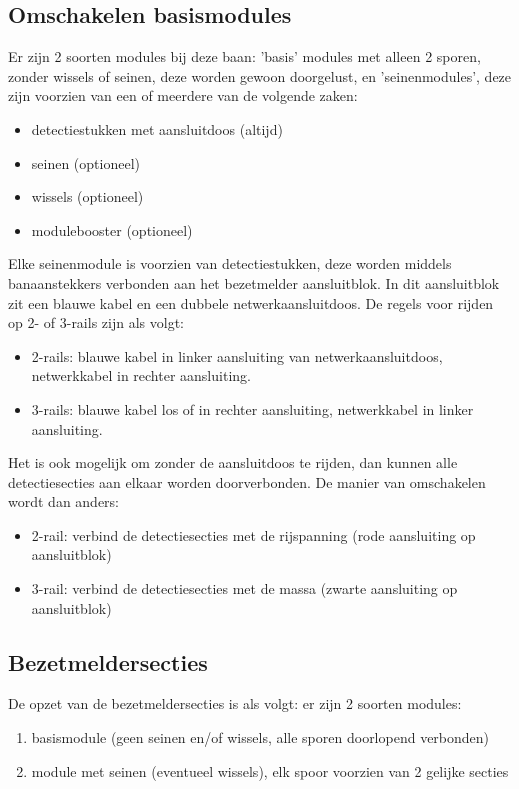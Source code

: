 \documentclass[12pt,a4paper]{report}
\begin{document}
\subsection{Omschakelen basismodules}
Er zijn 2 soorten modules bij deze baan: 'basis' modules met alleen 2 sporen, zonder wissels of seinen, deze worden gewoon doorgelust, en 'seinenmodules', deze zijn voorzien van een of meerdere van de volgende zaken:

\begin{itemize}
\item detectiestukken met aansluitdoos (altijd)
\item seinen (optioneel)
\item wissels (optioneel)
\item modulebooster (optioneel)
\end{itemize}

Elke seinenmodule is voorzien van detectiestukken, deze worden middels banaanstekkers verbonden aan het bezetmelder aansluitblok.  In dit aansluitblok zit een blauwe kabel en een dubbele netwerkaansluitdoos. De regels voor rijden op 2- of 3-rails zijn als volgt:

\begin{itemize}
\item 2-rails: blauwe kabel in linker aansluiting van netwerkaansluitdoos, netwerkkabel in rechter aansluiting.
\item 3-rails: blauwe kabel los of in rechter aansluiting, netwerkkabel in linker aansluiting.
\end{itemize}

Het is ook mogelijk om zonder de aansluitdoos te rijden, dan kunnen alle detectiesecties aan elkaar worden doorverbonden. De manier van omschakelen wordt dan anders:

\begin{itemize}
\item 2-rail: verbind de detectiesecties met de rijspanning (rode aansluiting op aansluitblok)
\item 3-rail: verbind de detectiesecties met de massa (zwarte aansluiting op aansluitblok)
\end{itemize}

\subsection{Bezetmeldersecties}
De opzet van de bezetmeldersecties is als volgt:
er zijn 2 soorten modules:

\begin{enumerate}
\item basismodule (geen seinen en/of wissels, alle sporen doorlopend verbonden)
\item module met seinen (eventueel wissels), elk spoor voorzien van 2 gelijke secties
\end{enumerate}
\end{document}
